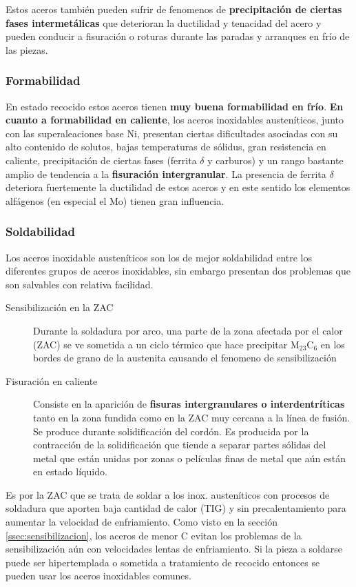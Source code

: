 Estos aceros también pueden sufrir de fenomenos de \textbf{precipitación de ciertas fases intermetálicas} que deterioran la ductilidad y tenacidad del acero y pueden conducir a fisuración o roturas durante las paradas y arranques en frío de las piezas.

\subsubsection{Formabilidad}
En estado recocido estos aceros tienen \textbf{muy buena formabilidad en frío}. \textbf{En cuanto a formabilidad en caliente}, los aceros inoxidables austeníticos, junto con las superaleaciones base Ni, presentan ciertas dificultades asociadas con su alto contenido de solutos, bajas temperaturas de sólidus, gran resistencia en caliente, precipitación de ciertas fases (ferrita $\delta$ y carburos) y un rango bastante amplio de tendencia a la \textbf{fisuración intergranular}. La presencia de ferrita $\delta$ deteriora fuertemente la ductilidad de estos aceros y en este sentido los elementos alfágenos (en especial el Mo) tienen gran influencia.


\subsubsection{Soldabilidad}

Los aceros inoxidable austeníticos son los de mejor soldabilidad entre los diferentes grupos de aceros inoxidables, sin embargo presentan dos problemas que son salvables con relativa facilidad.

\begin{description}
	\item[Sensibilización en la ZAC] Durante la soldadura por arco, una parte de la zona afectada por el calor (ZAC) se ve sometida a un ciclo térmico que hace precipitar M$_23$C$_6$ en los bordes de grano de la austenita causando el fenomeno de sensibilización
	\item[Fisuración en caliente] Consiste en la aparición de \textbf{fisuras intergranulares o interdentríticas} tanto en la zona fundida como en la ZAC muy cercana a la línea de fusión. Se produce durante solidificación del cordón. Es producida por la contracción de la solidificación que tiende a separar partes sólidas del metal que están unidas por zonas o películas finas de metal que aún están en estado líquido. 
\end{description}

Es por la ZAC que se trata de soldar a los inox. austeníticos con procesos de soldadura que aporten baja cantidad de calor (TIG) y sin precalentamiento para aumentar la velocidad de enfriamiento. Como visto en la sección \ref{ssec:sensibilizacion}, los aceros de menor C evitan los problemas de la sensibilización aún con velocidades lentas de enfriamiento. Si la pieza a soldarse puede ser hipertemplada o sometida a tratamiento de recocido entonces se pueden usar los aceros inoxidables comunes.


